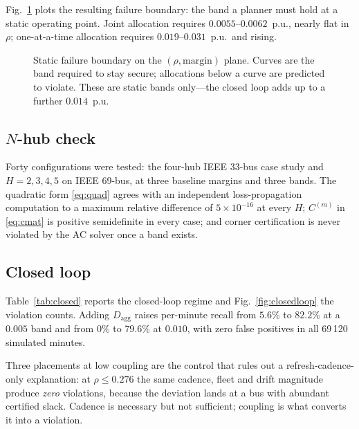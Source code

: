 \documentclass[lettersize,journal]{IEEEtran}
\newcommand{\Dagg}{D_{\mathrm{agg}}}
\begin{document}
Fig.~\ref{fig:boundary} plots the resulting failure boundary: the band a
planner must hold at a static operating point. Joint allocation requires
$0.0055$--$0.0062$~p.u., nearly flat in $\rho$; one-at-a-time allocation
requires $0.019$--$0.031$~p.u.\ and rising.

\begin{figure}[!t]\centering

\caption{Static failure boundary on the $(\rho,\text{margin})$ plane. Curves
are the band required to stay secure; allocations below a curve are predicted
to violate. These are static bands only---the closed loop adds up to a further
$0.014$~p.u.}
\label{fig:boundary}
\end{figure}

\subsection{$N$-hub check}
Forty configurations were tested: the four-hub IEEE 33-bus case study and
$H=2,3,4,5$ on IEEE 69-bus, at three baseline margins and three bands. The
quadratic form \eqref{eq:quad} agrees with an independent loss-propagation
computation to a maximum relative difference of $5\times10^{-16}$ at every $H$;
$C^{(m)}$ in \eqref{eq:cmat} is positive semidefinite in every case; and corner
certification is never violated by the AC solver once a band exists.

\subsection{Closed loop}\label{sec:closed}
Table~\ref{tab:closed} reports the closed-loop regime and
Fig.~\ref{fig:closedloop} the violation counts. Adding $\Dagg$ raises
per-minute recall from $5.6\%$ to $82.2\%$ at a $0.005$ band and from $0\%$ to
$79.6\%$ at $0.010$, with zero false positives in all 69\,120 simulated
minutes.

Three placements at low coupling are the control that rules out a
refresh-cadence-only explanation: at $\rho\le 0.276$ the same cadence, fleet
and drift magnitude produce \emph{zero} violations, because the deviation lands
at a bus with abundant certified slack. Cadence is necessary but not
sufficient; coupling is what converts it into a violation.
\end{document}
